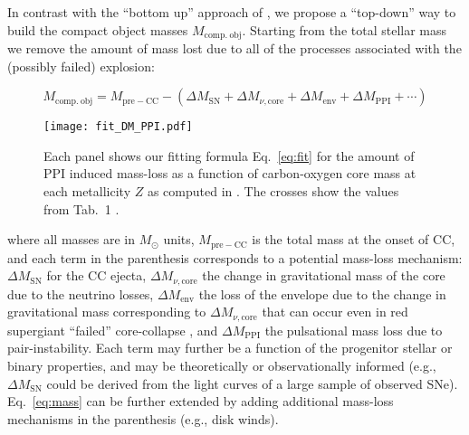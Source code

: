 \documentclass[twocolumn]{aastex63}
\DeclareRobustCommand{\Eqref}[1]{Eq.~\ref{#1}}
\newcommand{\todo}[1]{{\large $\blacksquare$~\textbf{\color{red}[#1]}}~$\blacksquare$}
\begin{document}
In contrast with the  ``bottom up'' approach of
\cite{fryer:12}, we propose a ``top-down'' way to build the compact object masses
$M_\mathrm{comp.\ obj}$. Starting from the total stellar mass we
remove the amount of mass lost due to all of the processes
associated with the (possibly failed) explosion:


\begin{widetext}
  \begin{equation}
    \label{eq:mass}
    M_\mathrm{comp.\ obj} = M_\mathrm{pre-CC} - \left(\Delta M_\mathrm{SN} + \Delta M_{\nu, \mathrm{core}} + \Delta M_\mathrm{env} + \Delta M_\mathrm{PPI} + \cdots \right)
  \end{equation}
\end{widetext}

\begin{figure}[ht!]
    \begin{centering}
      \texttt{[image: fit\_DM\_PPI.pdf]}
      \caption{Each panel shows our fitting formula \Eqref{eq:fit} for
        the amount of PPI induced mass-loss as a function of carbon-oxygen
        core mass at each metallicity $Z$ as computed in
        \cite{farmer:19}. The crosses show the values from Tab.~1
        \cite{farmer:19}.}
        \label{fig:fit_DM_PPI}
    \end{centering}
\end{figure}

where all masses are in $M_\odot$ units, $M_\mathrm{pre-CC}$ is the
total mass at the onset of CC, and each term in the parenthesis
corresponds to a potential mass-loss mechanism: $\Delta M_\mathrm{SN}$
for the CC ejecta, $\Delta M_{\nu, \mathrm{core}}$ the change in
gravitational mass of the core due to the neutrino losses,
$\Delta M_\mathrm{env}$ the loss of the envelope due to the change in
gravitational mass corresponding to $\Delta M_{\nu, \mathrm{core}}$
that can occur even in red supergiant ``failed'' core-collapse
\citep{nadezhin:80, lovegrove:13, piro:13, fernandez:18, ivanov:21},
and $\Delta M_\mathrm{PPI}$ the pulsational mass loss due to
pair-instability. Each term may further be a function of the progenitor stellar or binary
properties, and may be theoretically or observationally informed
(e.g., $\Delta M_\mathrm{SN}$ could be derived from the light curves of a
large sample of observed SNe). \Eqref{eq:mass} can be further extended by
adding additional mass-loss mechanisms in the parenthesis (e.g., disk
winds).
\end{document}
